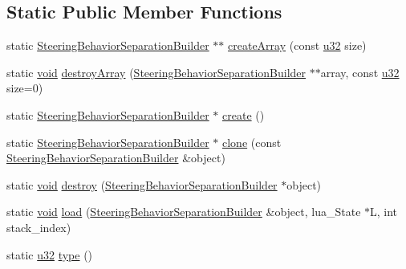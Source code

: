 \subsection*{Static Public Member Functions}
\begin{DoxyCompactItemize}
\item 
static \mbox{\hyperlink{classnjli_1_1_steering_behavior_separation_builder}{Steering\+Behavior\+Separation\+Builder}} $\ast$$\ast$ \mbox{\hyperlink{classnjli_1_1_steering_behavior_separation_builder_aa14d337599a98b074a65c021acea4b18}{create\+Array}} (const \mbox{\hyperlink{_util_8h_a10e94b422ef0c20dcdec20d31a1f5049}{u32}} size)
\item 
static \mbox{\hyperlink{_thread_8h_af1e856da2e658414cb2456cb6f7ebc66}{void}} \mbox{\hyperlink{classnjli_1_1_steering_behavior_separation_builder_a80448ab44df7279df4931818952d37b3}{destroy\+Array}} (\mbox{\hyperlink{classnjli_1_1_steering_behavior_separation_builder}{Steering\+Behavior\+Separation\+Builder}} $\ast$$\ast$array, const \mbox{\hyperlink{_util_8h_a10e94b422ef0c20dcdec20d31a1f5049}{u32}} size=0)
\item 
static \mbox{\hyperlink{classnjli_1_1_steering_behavior_separation_builder}{Steering\+Behavior\+Separation\+Builder}} $\ast$ \mbox{\hyperlink{classnjli_1_1_steering_behavior_separation_builder_a4152138e4606ac9a637c931a3847cf0e}{create}} ()
\item 
static \mbox{\hyperlink{classnjli_1_1_steering_behavior_separation_builder}{Steering\+Behavior\+Separation\+Builder}} $\ast$ \mbox{\hyperlink{classnjli_1_1_steering_behavior_separation_builder_af167db158a4fe186515d03c84e49351c}{clone}} (const \mbox{\hyperlink{classnjli_1_1_steering_behavior_separation_builder}{Steering\+Behavior\+Separation\+Builder}} \&object)
\item 
static \mbox{\hyperlink{_thread_8h_af1e856da2e658414cb2456cb6f7ebc66}{void}} \mbox{\hyperlink{classnjli_1_1_steering_behavior_separation_builder_ab4820fd7274ab4bd325f84bba418f63e}{destroy}} (\mbox{\hyperlink{classnjli_1_1_steering_behavior_separation_builder}{Steering\+Behavior\+Separation\+Builder}} $\ast$object)
\item 
static \mbox{\hyperlink{_thread_8h_af1e856da2e658414cb2456cb6f7ebc66}{void}} \mbox{\hyperlink{classnjli_1_1_steering_behavior_separation_builder_a5ef3795529670dd6020071f837c1a530}{load}} (\mbox{\hyperlink{classnjli_1_1_steering_behavior_separation_builder}{Steering\+Behavior\+Separation\+Builder}} \&object, lua\+\_\+\+State $\ast$L, int stack\+\_\+index)
\item 
static \mbox{\hyperlink{_util_8h_a10e94b422ef0c20dcdec20d31a1f5049}{u32}} \mbox{\hyperlink{classnjli_1_1_steering_behavior_separation_builder_a5e77abdfe51a525207cd6aca7d741994}{type}} ()
\end{DoxyCompactItemize}

